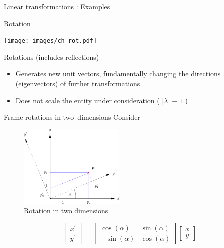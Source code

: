 \documentclass[presentation]{beamer}
\newcommand{\bv}[1]{\ensuremath{\mathbf{#1}}}
\newcommand{\abs}[1]{\left\lvert#1\right\rvert}
\begin{document}
\begin{frame}[label={sec:orgd4e4602}]{Linear transformations : Examples}
\begin{block}{Rotation}
\begin{center}
\spot<2>{\( \bv{M} =\begin{bmatrix}\cos(\theta )&\sin(\theta )&0\\-\sin(\theta
 )&\cos(\theta )&0\\0&0&1\end{bmatrix} \text{with } \theta = \frac{\pi}{6}\)}
\end{center}

\begin{center}
\texttt{[image: images/ch\_rot.pdf]}
\end{center}
\end{block}
\end{frame}
\begin{frame}[label={sec:org1b8fcfb}]{Rotations (includes reflections)}
\begin{itemize}
\item Generates new unit vectors, fundamentally changing the directions
(eigenvectors) of further transformations
\item Does not scale the entity under consideration ( \(\abs{\lambda} \equiv  1\) )
\end{itemize}
\end{frame}
\begin{frame}[label={sec:org741efab}]{Frame rotations in two--dimensions}
Consider
\begin{figure}[htbp]
\centering
\includegraphics[width=0.45\textwidth]{images/cartesian_rotation.png}
\caption{Rotation in two dimensions}
\end{figure}

\[ \begin{bmatrix} x^\prime \\ y^\prime \end{bmatrix}
   = \begin{bmatrix}\cos(\alpha )&\sin(\alpha )\\ -\sin(\alpha
   )&\cos(\alpha )\end{bmatrix} \begin{bmatrix} x\\ y\end{bmatrix}\]
\end{frame}
\end{document}
